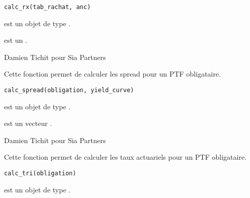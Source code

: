 \documentclass[a4paper]{book}
\begin{document}
%
\begin{Usage}
\begin{verbatim}
calc_rx(tab_rachat, anc)
\end{verbatim}
\end{Usage}
%
\begin{Arguments}
\begin{ldescription}
\item[\code{tab\_rachat}] est un objet de type .

\item[\code{anc}] est un .
\end{ldescription}
\end{Arguments}
%
\begin{Author}\relax
Damien Tichit pour Sia Partners
\end{Author}
%
\begin{Description}\relax
Cette fonction permet de calculer les spread pour un PTF obligataire.
\end{Description}
%
\begin{Usage}
\begin{verbatim}
calc_spread(obligation, yield_curve)
\end{verbatim}
\end{Usage}
%
\begin{Arguments}
\begin{ldescription}
\item[\code{obligation}] est un objet de type .

\item[\code{yield\_curve}] est un vecteur .
\end{ldescription}
\end{Arguments}
%
\begin{Author}\relax
Damien Tichit pour Sia Partners
\end{Author}
%
\begin{Description}\relax
Cette fonction permet de calculer les taux actuariels pour un PTF obligataire.
\end{Description}
%
\begin{Usage}
\begin{verbatim}
calc_tri(obligation)
\end{verbatim}
\end{Usage}
%
\begin{Arguments}
\begin{ldescription}
\item[\code{obligation}] est un objet de type .
\end{ldescription}
\end{Arguments}
\end{document}
